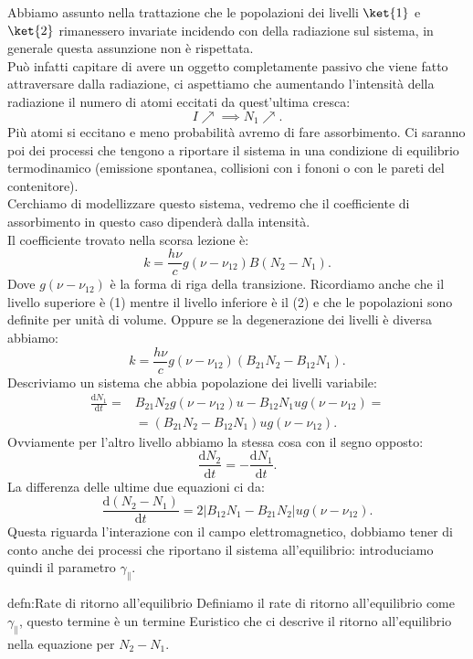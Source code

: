 Abbiamo assunto nella trattazione che le popolazioni dei livelli $\ket{1}$ e $\ket{2}$ rimanessero invariate incidendo con della radiazione sul sistema, in generale questa assunzione non è rispettata.\\ 
Può infatti capitare di avere un oggetto completamente passivo che viene fatto attraversare dalla radiazione, ci aspettiamo che aumentando l'intensità della radiazione il numero di atomi eccitati da quest'ultima cresca: 
\[
    I\nearrow\implies N_1\nearrow
.\] 
Più atomi si eccitano e meno probabilità avremo di fare assorbimento.
Ci saranno poi dei processi che tengono a riportare il sistema in una condizione di equilibrio termodinamico (emissione spontanea, collisioni con i fononi o con le pareti del contenitore).\\
Cerchiamo di modellizzare questo sistema, vedremo che il coefficiente di assorbimento in questo caso dipenderà dalla intensità.\\
Il coefficiente trovato nella scorsa lezione è:
\[
    k = \frac{h\nu}{c}g(\nu-\nu_{12})B \left(N_2-N_1\right)
.\] 
Dove $g(\nu-\nu_{12})$ è la forma di riga della transizione. Ricordiamo anche che il livello superiore è (1) mentre il livello inferiore è il (2) e che le popolazioni sono definite per unità di volume.
Oppure se la degenerazione dei livelli è diversa abbiamo:
\[
    k = \frac{h\nu}{c}g(\nu-\nu_{12}) \left(B_{21}N_2-B_{12}N_1\right)
.\] 
Descriviamo un sistema che abbia popolazione dei livelli variabile:
\[\begin{aligned}
    \frac{\text{d} N_1}{\text{d} t} =& B_{21}N_2g(\nu-\nu_{12}) u 
    -B_{12}N_1 u g(\nu-\nu_{12}) =\\
	&=\left(B_{21}N_2- B_{12}N_1\right)ug(\nu-\nu_{12}) 
.\end{aligned}\]
Ovviamente per l'altro livello abbiamo la stessa cosa con il segno opposto:
\[
    \frac{\text{d} N_2}{\text{d} t} = -\frac{\text{d} N_1}{\text{d} t}
.\] 
La differenza delle ultime due equazioni ci da:
\[
    \frac{\text{d} \left(N_2-N_1\right)}{\text{d} t} =
    2\left|B_{12}N_1-B_{21}N_2\right|u g(\nu-\nu_{12}) 
.\] 
Questa riguarda l'interazione con il campo elettromagnetico, dobbiamo tener di conto anche dei processi che riportano il sistema all'equilibrio: introduciamo quindi il parametro $\gamma_{\parallel}$.
\begin{defn}{defn:Rate di ritorno all'equilibrio}
Definiamo il rate di ritorno all'equilibrio come $\gamma_\parallel$, questo termine è un termine Euristico che ci descrive il ritorno all'equilibrio nella equazione per $N_2-N_1$. 
\end{defn}

